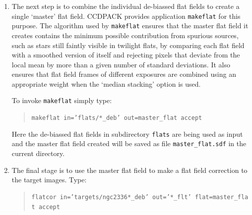 \documentclass[twoside,11pt]{article}
\begin{document}
\begin{enumerate}
\begin{itemize}
    \begin{quote}
     {\tt flats/sky\_r\_6\_deb.sdf \\
     flats/sky\_r\_7\_deb.sdf}
    \end{quote}

  \end{itemize}

   Now repeat the procedure to de-bias the target images:

  \begin{quote}
   {\tt debias in='targets/ngc2336*' out='*\_deb' bias=master\_bias
   accept}
  \end{quote}

   If you have a non-zeroed master bias frame or you are using only bias
   strips rather than bias frames then you need to specify different
   options for {\tt debias}.  Section~\ref{ADDOPT} introduces some of the
   alternatives.

  \item The next step is to combine the individual de-biassed flat fields
   to create a single `master' flat field.  CCDPACK provides application
   {\tt makeflat} for this purpose.  The algorithm used by {\tt makeflat}
   ensures that the master flat field it creates contains the minimum
   possible contribution from spurious sources, such as stars still faintly
   visible in twilight flats, by comparing each flat field with a smoothed
   version of itself and rejecting pixels that deviate from the local mean
   by more than a given number of standard deviations.  It also ensures
   that flat field frames of different exposures are combined using an
   appropriate weight when the `median stacking' option is used.

   To invoke {\tt makeflat} simply type:

  \begin{quote}
   {\tt makeflat in='flats/*\_deb' out=master\_flat accept}
  \end{quote}

   Here the de-biassed flat fields in subdirectory {\tt flats} are being
   used as input and the master flat field created will be saved as
   file {\tt master\_flat.sdf} in the current directory.

  \item The final stage is to use the master flat field to make a flat
   field correction to the target images.  Type:

  \begin{quote}
   {\tt flatcor~in='targets/ngc2336*\_deb'~out='*\_flt'~flat=master\_flat
   accept}
  \end{quote}


\end{enumerate}
\end{document}
